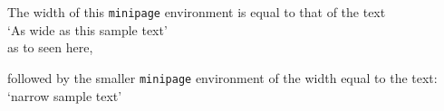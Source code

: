 \documentclass{article}
\newlength{\varwidth}
\newenvironment{varpage}[1]
   {\settowidth{\varwidth}{#1}\begin{minipage}{\varwidth}}
   {\end{minipage}}
\begin{document}
\noindent
\begin{varpage}{`As wide as this sample text'}
  The width of this \texttt{minipage} environment is equal to that of the
  text\\
  `As wide as this sample text'\\
  as to seen here,
\end{varpage}\qquad
\begin{varpage}{`narrow sample text'}
  followed by the smal\-ler \texttt{minipage} environment of the width equal
  to the text:\\
  `narrow sample text'
\end{varpage}
\end{document}
